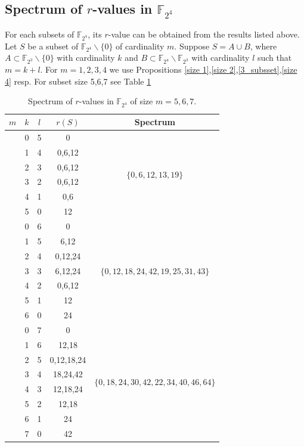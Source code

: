 \documentclass[12pt,a4paper]{article}
\begin{document}
	\subsection{Spectrum of $r$-values in $\mathbb{F}_{2^4}$}\label{F_2_4}
	For each subsets of $\mathbb{F}_{2^4}$, its $r$-value can be obtained from the results listed above. Let $S$ be a subset of $\mathbb{F}_{2^4}\backslash\{0\}$ of cardinality $m$. Suppose $S=A\cup B$, where $A\subset\mathbb{F}_{2^3}\backslash\{0\}$ with cardinality $k$ and  $B\subset\mathbb{F}_{2^4}\backslash\mathbb{F}_{2^3}$ with cardinality $l$ such that $m=k+l$. For $m=1,2,3,4$ we use  Propositions \ref{size 1},\ref{size 2},\ref{3_subsset},\ref{size 4} resp. For subset size 5,6,7 see Table \ref{table2-3-1}
	\begin{table}[h]\label{table2-3-1}	
		\caption{Spectrum of $r$-values in $\mathbb{F}_{2^4}$ of size $m=5,6,7$.}		
		\begin{center}
			\begin{tabular}{|c|c|c|c|c|}
				\hline
				$m$	&$k$ &$l$ &$r(S)$ & Spectrum \\
				\hline
				\multirow{6}{1cm}{\centering 5}	&0 &5 &0 &\multirow{6}{6cm}{\centering $\{0,6,12,13,19\}$}\\
				\cline{2-4}
				&1 &4 &0,6,12 & \\
				\cline{2-4}
				&2 &3 &0,6,12 &\\
				\cline{2-4}
				&3 &2 &0,6,12 & \\
				\cline{2-4}
				&4 &1 &0,6 & \\
				\cline{2-4}
				&5 &0 &12 & \\
				\hline
				\multirow{7}{1cm}{\centering 6}	&0 &6 &0 &\multirow{7}{6cm}{\centering $\{0,12,18,24,42,19,25,31,43\}$}\\
				\cline{2-4}
				&1 &5 &6,12 & \\
				\cline{2-4}
				&2 &4 &0,12,24 & \\
				\cline{2-4}
				&3 &3 &6,12,24 & \\
				\cline{2-4}
				&4 &2 &0,6,12& \\
				\cline{2-4}
				&5 &1 &12 & \\
				\cline{2-4}
				&6 &0 &24 & \\
				\hline
				\multirow{8}{1cm}{\centering 7}	&0 &7 &0 &\multirow{8}{6cm}{\centering $\{0,18,24,30,42,22,34,40,46,64\}$} \\
				\cline{2-4}
				&1 &6 &12,18 & \\
				\cline{2-4}
				&2 &5 &0,12,18,24 & \\
				\cline{2-4}
				&3 &4 & 18,24,42&\\
				\cline{2-4}
				&4 &3 & 12,18,24& \\
				\cline{2-4}
				&5 &2 &12,18 & \\
				\cline{2-4}
				&6 &1 &24 & \\
				\cline{2-4}
				&7 &0 & 42& \\
				\hline
			\end{tabular}
		\end{center}								
	\end{table}
\end{document}
